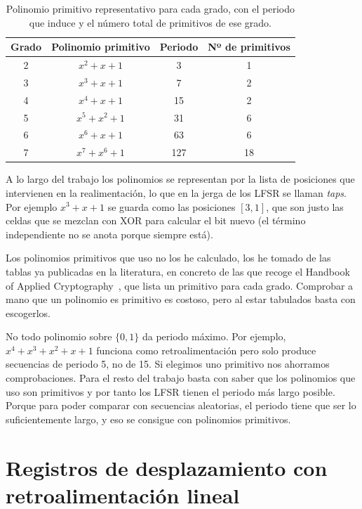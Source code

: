 \begin{table}[ht]
\centering
\begin{tabular}{cccc}
\hline
\textbf{Grado} & \textbf{Polinomio primitivo} & \textbf{Periodo} & \textbf{Nº de primitivos} \\
\hline
2 & $x^2 + x + 1$           & 3    & 1 \\
3 & $x^3 + x + 1$           & 7    & 2 \\
4 & $x^4 + x + 1$           & 15   & 2 \\
5 & $x^5 + x^2 + 1$         & 31   & 6 \\
6 & $x^6 + x + 1$           & 63   & 6 \\
7 & $x^7 + x^6 + 1$         & 127  & 18 \\
\hline
\end{tabular}
\caption{Polinomio primitivo representativo para cada grado, con el periodo que induce
y el número total de primitivos de ese grado.}
\label{tab:primitivos}
\end{table}

A lo largo del trabajo los polinomios se representan por la lista de posiciones que intervienen en la realimentación,
lo que en la jerga de los LFSR se llaman \textit{taps}. Por ejemplo $x^3 + x + 1$ se guarda como las posiciones $[3, 1]$,
que son justo las celdas que se mezclan con XOR para calcular el bit nuevo (el término independiente no se anota porque siempre está).

Los polinomios primitivos que uso no los he calculado, los he tomado de las tablas ya publicadas en la literatura,
en concreto de las que recoge el Handbook of Applied Cryptography~\cite{menezes1996}, que lista un primitivo para cada grado.
Comprobar a mano que un polinomio es primitivo es costoso, pero al estar tabulados basta con escogerlos.

No todo polinomio sobre $\{0,1\}$ da periodo máximo. Por ejemplo, $x^4 + x^3 + x^2 + x + 1$ funciona como retroalimentación
pero solo produce secuencias de periodo 5, no de 15. Si elegimos uno primitivo nos ahorramos comprobaciones.
Para el resto del trabajo basta con saber que los polinomios que uso son primitivos y por tanto los LFSR tienen el periodo más largo posible.
Porque para poder comparar con secuencias aleatorias, el periodo tiene que ser lo suficientemente largo, y eso se consigue con polinomios primitivos.

\section{Registros de desplazamiento con retroalimentación lineal}


